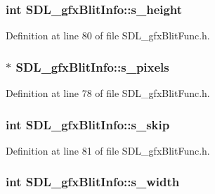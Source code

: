 \subsubsection[{s\+\_\+height}]{\setlength{\rightskip}{0pt plus 5cm}int S\+D\+L\+\_\+gfx\+Blit\+Info\+::s\+\_\+height}\label{struct_s_d_l__gfx_blit_info_a71cc45d98329f686741c9ce6e6344ece}


Definition at line 80 of file S\+D\+L\+\_\+gfx\+Blit\+Func.\+h.

\hypertarget{struct_s_d_l__gfx_blit_info_afdacfb5c8054051bac7b21e3f99ee286}{}
\subsubsection[{s\+\_\+pixels}]{$\ast$ S\+D\+L\+\_\+gfx\+Blit\+Info\+::s\+\_\+pixels}\label{struct_s_d_l__gfx_blit_info_afdacfb5c8054051bac7b21e3f99ee286}


Definition at line 78 of file S\+D\+L\+\_\+gfx\+Blit\+Func.\+h.

\hypertarget{struct_s_d_l__gfx_blit_info_a1e8f74883ce15abf766f0f9c1819c9b6}{}
\subsubsection[{s\+\_\+skip}]{\setlength{\rightskip}{0pt plus 5cm}int S\+D\+L\+\_\+gfx\+Blit\+Info\+::s\+\_\+skip}\label{struct_s_d_l__gfx_blit_info_a1e8f74883ce15abf766f0f9c1819c9b6}


Definition at line 81 of file S\+D\+L\+\_\+gfx\+Blit\+Func.\+h.

\hypertarget{struct_s_d_l__gfx_blit_info_a5af7fc9d6709cccb7317122b6461f4e0}{}
\subsubsection[{s\+\_\+width}]{\setlength{\rightskip}{0pt plus 5cm}int S\+D\+L\+\_\+gfx\+Blit\+Info\+::s\+\_\+width}\label{struct_s_d_l__gfx_blit_info_a5af7fc9d6709cccb7317122b6461f4e0}


